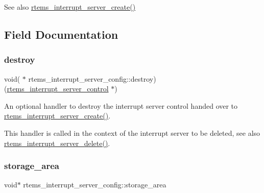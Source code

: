\begin{DoxySeeAlso}{See also}
\mbox{\hyperlink{group__rtems__interrupt__extension_gad7725dd729bfd34f36c0de4d9c326abc}{rtems\+\_\+interrupt\+\_\+server\+\_\+create()}} 
\end{DoxySeeAlso}


\subsection{Field Documentation}
\mbox{\label{structrtems__interrupt__server__config_a3d26283a8aad002ccb982b4031db3ec2}} 
\subsubsection{\texorpdfstring{destroy}{destroy}}
{\footnotesize\ttfamily void( $\ast$ rtems\+\_\+interrupt\+\_\+server\+\_\+config\+::destroy) (\mbox{\hyperlink{structrtems__interrupt__server__control}{rtems\+\_\+interrupt\+\_\+server\+\_\+control}} $\ast$)}



An optional handler to destroy the interrupt server control handed over to \mbox{\hyperlink{group__rtems__interrupt__extension_gad7725dd729bfd34f36c0de4d9c326abc}{rtems\+\_\+interrupt\+\_\+server\+\_\+create()}}. 

This handler is called in the context of the interrupt server to be deleted, see also \mbox{\hyperlink{group__rtems__interrupt__extension_gaa1093bab07e2fe4be3ea1025ea5d15a7}{rtems\+\_\+interrupt\+\_\+server\+\_\+delete()}}. \mbox{\label{structrtems__interrupt__server__config_aa9ec46bb3b6ae7574579eb07c4c41e60}} 
\subsubsection{\texorpdfstring{storage\_area}{storage\_area}}
{\footnotesize\ttfamily void$\ast$ rtems\+\_\+interrupt\+\_\+server\+\_\+config\+::storage\+\_\+area}



